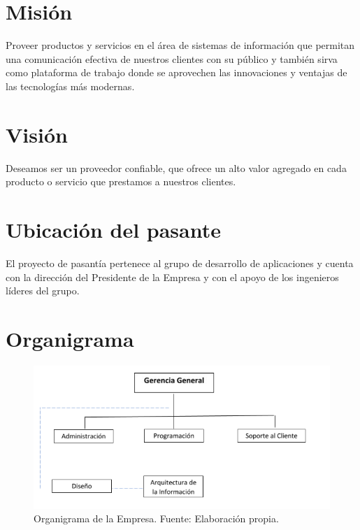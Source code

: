 \section{Misión}
Proveer productos y servicios en el área de sistemas de información que permitan una comunicación efectiva de nuestros clientes con su público y también sirva como plataforma de trabajo donde se aprovechen las innovaciones y ventajas de las tecnologías más modernas.

\section{Visión}
Deseamos ser un proveedor confiable, que ofrece un alto valor agregado en cada producto o servicio que prestamos a nuestros clientes.

\section{Ubicación del pasante}
El proyecto de pasantía pertenece al grupo de desarrollo de aplicaciones y cuenta con la dirección del Presidente de la Empresa y con el apoyo de los ingenieros líderes del grupo.

\section{Organigrama}
\begin{figure}[hbt]
\begin{center}
\includegraphics[scale=0.8]{organigrama}
\caption{Organigrama de la Empresa. Fuente: Elaboración propia.}
\label{fig:figura1}
\end{center}
\end{figure}
